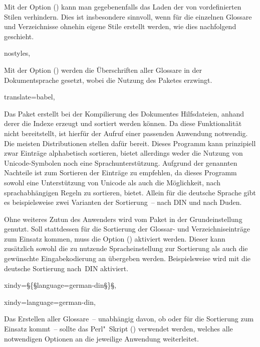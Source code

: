 \documentclass[%
  english,ngerman,%
  cdgeometry=no,DIV=12,%
  cd=false,cdfont=false,cdtitle=true,%
  headings=normal,%
  automark,%
  listof=toc,%
]{tudscrartcl}
\begin{document}
%
Mit der Option () kann man gegebenenfalls 
das Laden der von  vordefinierten Stilen verhindern. Dies 
ist insbesondere sinnvoll, wenn für die einzelnen Glossare und Verzeichnisse 
ohnehin eigene Stile erstellt werden, wie dies nachfolgend geschieht.
%
\begin{Preamble}
  nostyles,%
\end{Preamble}
%
Mit der Option () werden die Überschriften
aller Glossare in der Dokumentsprache gesetzt, wobei  
die Nutzung des Paketes  erzwingt. 
%
\begin{Preamble}
  translate=babel,%
\end{Preamble}
%
Das Paket  erstellt bei der Kompilierung des Dokumentes 
Hilfsdateien, anhand derer die Indexe erzeugt und sortiert werden können. Da 
 diese Funktionalität nicht bereitstellt, ist hierfür der 
Aufruf einer passenden Anwendung notwendig. Die meisten Distributionen stellen
dafür  bereit. Dieses Programm kann prinzipiell zwar 
Einträge alphabetisch sortieren, bietet allerdings weder die Nutzung von 
Unicode-Symbolen noch eine Sprachunterstützung. Aufgrund der genannten 
Nachteile ist  zum Sortieren der Einträge zu empfehlen, da 
dieses Programm sowohl eine Unterstützung von Unicode als auch die Möglichkeit, 
nach sprachabhängigen Regeln zu sortieren, bietet. Allein für die deutsche 
Sprache gibt es beispielsweise zwei Varianten der Sortierung~-- nach DIN und 
nach Duden. 

Ohne weiteres Zutun des Anwenders wird vom Paket  in der 
Grundeinstellung  genutzt. Soll stattdessen für die 
Sortierung der Glossar- und Verzeichniseinträge  zum Einsatz 
kommen, muss die Option () aktiviert werden.
Dieser kann zusätzlich sowohl die zu nutzende Spracheinstellung zur Sortierung 
als auch die gewünschte Eingabekodierung an  übergeben 
werden. Beispielsweise wird mit 
die deutsche Sortierung nach~DIN aktiviert.
%
%
\begin{Hint}
  xindy=§\{§language=german-din§\}§,
\end{Hint}
\begin{Preamble+}
  xindy={language=german-din},
\end{Preamble+}
%
Das Erstellen aller Glossare~-- unabhängig davon, ob  oder 
 für die Sortierung zum Einsatz kommt~-- sollte das 
Perl"~Skript () verwendet werden, 
welches alle notwendigen Optionen an die jeweilige Anwendung weiterleitet.
\end{document}
